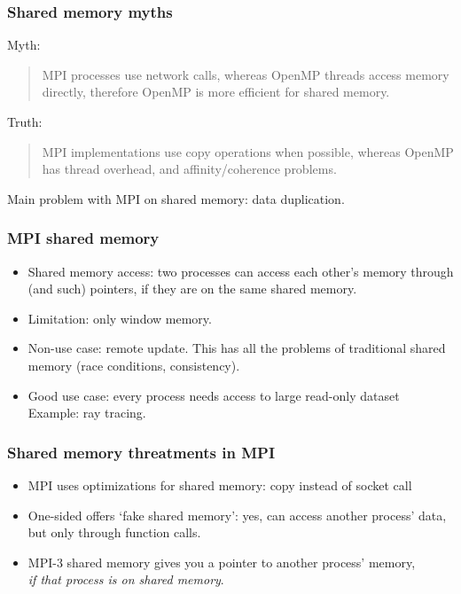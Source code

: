 
\begin{frame}[containsverbatim]\frametitle{Shared memory myths}
  Myth:
  \begin{quote}
    MPI processes use network calls, whereas OpenMP threads access memory directly,
    therefore OpenMP is more efficient for shared memory.
  \end{quote}
  Truth:
  \begin{quote}
    MPI implementations use copy operations when possible, whereas OpenMP
    has thread overhead, and affinity/coherence problems.
  \end{quote}
  Main problem with MPI on shared memory: data duplication.
\end{frame}

\begin{frame}[containsverbatim]\frametitle{MPI shared memory}
  \begin{itemize}
  \item Shared memory access: two processes can access each other's
    memory through  (and such) pointers, if they are
    on the same shared memory.
  \item Limitation: only window memory.
  \item Non-use case: remote update. This has all the problems of
    traditional shared memory (race conditions, consistency).
  \item Good use case: every process needs access to large read-only
    dataset\\ Example: ray tracing.
  \end{itemize}
\end{frame}

\begin{frame}[containsverbatim]\frametitle{Shared memory threatments in MPI}
  \begin{itemize}
  \item MPI uses optimizations for shared memory: copy instead of
    socket call
  \item One-sided offers `fake shared memory': yes, can access another
    process' data, but only through function calls.
  \item MPI-3 shared memory gives you a pointer to another process'
    memory,\\
    \emph{if that process is on shared memory}.
  \end{itemize}
\end{frame}

